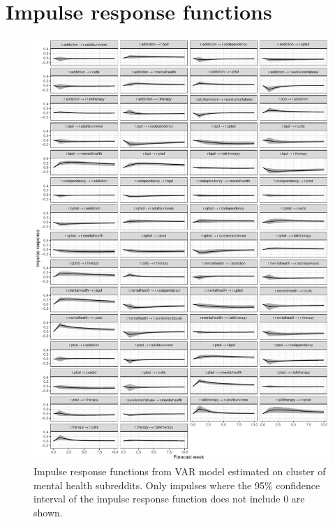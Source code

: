 \documentclass[manuscript]{acmart}\usepackage[]{graphicx}\usepackage[]{color}
\makeatletter
\def\maxwidth{ %
  \ifdim\Gin@nat@width>\linewidth
    \linewidth
  \else
    \Gin@nat@width
  \fi
}
\makeatother
\begin{document}
\clearpage
\section{Impulse response functions}

\begin{figure}[h]
\centering

\includegraphics[width=\maxwidth]{figures/knitr-mut_irf-1} 

\caption{Impulse response functions from VAR model estimated on cluster of mental health subreddits. Only impulses where the 95\% confidence interval of the impulse response function does not include 0 are shown. \label{mut.irf}}
\end{figure}
\end{document}
